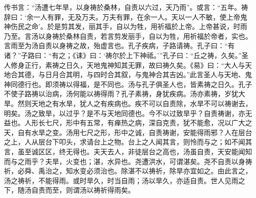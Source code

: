 \documentclass[]{article}
\begin{document}
传书言：``汤遭七年旱，以身祷於桑林，自责以六过，天乃雨''。或言：``五年。祷辞曰：`余一人有罪，无及万夫。万夫有罪，在余一人。天以一人不敏，使上帝鬼神伤民之命'。於是剪其发，丽其手，自以为牲，用祈福於上帝。上帝甚说，时雨乃至。言汤以身祷於桑林自责，若言剪发丽手，自以为牲，用祈福於帝者，实也。言雨至为汤自责以身祷之故，殆虚言也。孔子疾病，子路请祷。孔子曰：``有诸？''子路曰：``有之；《诔》曰：`祷尔於上下神祗。'''孔子曰：``丘之祷，久矣。''圣人修身正行，素祷之日久，天地鬼神知其无罪，故曰祷久矣。《易》曰：``大人与天地合其德，与日月合其明，与四时合其叙，与鬼神合其吉凶。''此言圣人与天地、鬼神同德行也。即须祷以得福，是不同也。汤与孔子俱圣人也，皆素祷之日久。孔子不使子路祷以治病，汤何能以祷得雨？孔子素祷，身犹疾病。汤亦素祷，岁犹大旱。然则天地之有水旱，犹人之有疾病也。疾不可以自责除，水旱不可以祷谢去，明矣。汤之致旱，以过乎？是不与天地同德也。今不以过致旱乎？自责祷谢，亦无益也。人形长七尺，形中有五常，有瘅热之病，深自克责，犹不能愈，况以广大之天，自有水旱之变。汤用七尺之形，形中之诚，自责祷谢，安能得雨邪？人在层台之上，人从层台下叩头，求请台上之物。台上之人闻其言，则怜而与之；如不闻其言，虽至诚区区，终无得也。夫天去人，非徒层台之高也，汤虽自责，天安能闻知而与之雨乎？夫旱，火变也；湛，水异也。尧遭洪水，可谓湛矣。尧不自责以身祷祈，必舜、禹治之，知水变必须治也。除湛不以祷祈，除旱亦宜如之。由此言之，汤之祷祈，不能得雨。或时旱久，时当自雨；汤以旱久，亦适自责。世人见雨之下，随汤自责而至，则谓汤以祷祈得雨矣。
\end{document}
